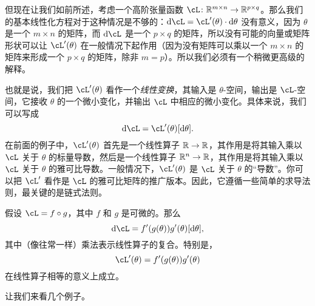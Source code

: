 \documentclass[../../book-main.tex]{subfiles}
\begin{document}
但现在让我们如前所述，考虑一个高阶张量函数 \(\cL \colon \R^{m \times n} \to \R^{p \times q}\)。那么我们的基本线性化方程对于这种情况是不够的：\(\odif{\cL} = \cL^{\prime}(\theta) \cdot \odif{\theta}\) 没有意义，因为 \(\theta\) 是一个 \(m \times n\) 的矩阵，而 \(\odif{\cL}\) 是一个 \(p \times q\) 的矩阵，所以没有可能的向量或矩阵形状可以让 \(\cL^{\prime}(\theta)\) 在一般情况下起作用（因为没有矩阵可以乘以一个 \(m \times n\) 的矩阵来形成一个 \(p \times q\) 的矩阵，除非 \(m = p\)）。所以我们必须有一个稍微更高级的解释。

也就是说，我们把 \(\cL^{\prime}(\theta)\) 看作一个\textit{线性变换}，其输入是 \(\theta\)-空间，输出是 \(\cL\)-空间，它接收 \(\theta\) 的一个微小变化，并输出 \(\cL\) 中相应的微小变化。具体来说，我们可以写成
\begin{equation}
    \odif{\cL} = \cL^{\prime}(\theta)[\odif{\theta}].
\end{equation}
在前面的例子中，\(\cL^{\prime}(\theta)\) 首先是一个线性算子 \(\mathbb{R} \to \mathbb{R}\)，其作用是将其输入乘以 \(\cL\) 关于 \(\theta\) 的标量导数，然后是一个线性算子 \(\mathbb{R}^{n} \to \mathbb{R}\)，其作用是将其输入乘以 \(\cL\) 关于 \(\theta\) 的雅可比导数。一般情况下，\(\cL^{\prime}(\theta)\) 是 \(\cL\) 关于 \(\theta\) 的“导数”。你可以把 \(\cL^{\prime}\) 看作是 \(\cL\) 的雅可比矩阵的推广版本。因此，它遵循一些简单的求导法则，最关键的是链式法则。

\begin{theorem}[微分链式法则]
    假设 \(\cL = f \circ g\)，其中 \(f\) 和 \(g\) 是可微的。那么
    \begin{equation}
        \odif{\cL} = f^{\prime}(g(\theta))g^{\prime}(\theta)[\odif{\theta}],
    \end{equation}
    其中（像往常一样）乘法表示线性算子的复合。特别是，
    \begin{equation}
        \cL^{\prime}(\theta) = f^{\prime}(g(\theta))g^{\prime}(\theta)
    \end{equation}
    在线性算子相等的意义上成立。
\end{theorem}

让我们来看几个例子。
\end{document}
